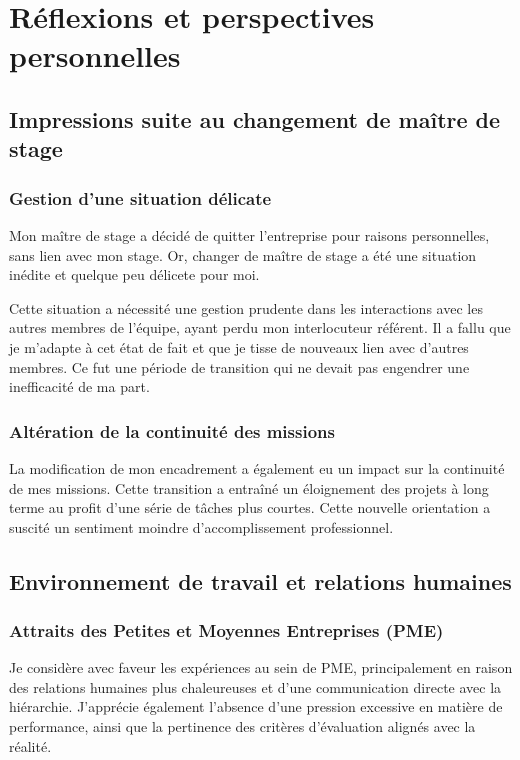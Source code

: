 \section{Réflexions et perspectives personnelles}
\subsection{Impressions suite au changement de maître de stage}
\subsubsection{Gestion d'une situation délicate}
Mon maître de stage a décidé de quitter l'entreprise pour raisons personnelles, sans lien avec mon stage.
Or, changer de maître de stage a été une situation inédite et quelque peu délicete pour moi.

Cette situation a nécessité une gestion prudente dans les interactions avec les autres membres de l'équipe, ayant perdu mon interlocuteur référent.
Il a fallu que je m'adapte à cet état de fait et que je tisse de nouveaux lien avec d'autres membres.
Ce fut une période de transition qui ne devait pas engendrer une inefficacité de ma part.

\subsubsection{Altération de la continuité des missions}
La modification de mon encadrement a également eu un impact sur la continuité de mes missions.
Cette transition a entraîné un éloignement des projets à long terme au profit d'une série de tâches plus courtes.
Cette nouvelle orientation a suscité un sentiment moindre d'accomplissement professionnel.


\subsection{Environnement de travail et relations humaines}
\subsubsection{Attraits des Petites et Moyennes Entreprises (PME)}
Je considère avec faveur les expériences au sein de PME, principalement en raison des relations humaines plus chaleureuses et d'une communication directe avec la hiérarchie.
J'apprécie également l'absence d'une pression excessive en matière de performance, ainsi que la pertinence des critères d'évaluation alignés avec la réalité.


